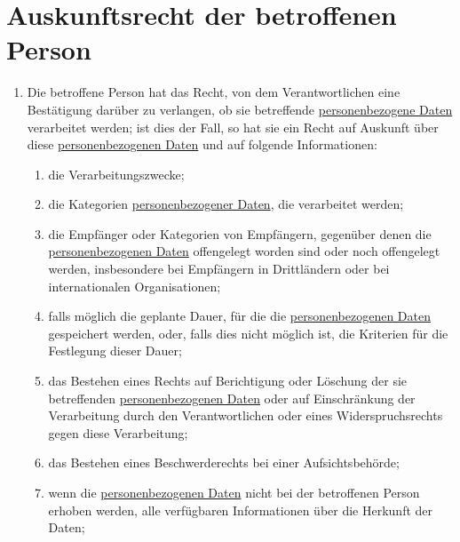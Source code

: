 \chapter{Auskunftsrecht der betroffenen Person}
\label{ch:15}


\begin{enumerate}

  \item Die betroffene Person hat das Recht, von dem Verantwortlichen eine Bestätigung darüber zu verlangen, ob sie
   betreffende \hyperref[itm:04-1]{personenbezogene Daten} verarbeitet werden; ist dies der Fall, so hat sie ein Recht auf Auskunft über
   diese \hyperref[itm:04-1]{personenbezogenen Daten} und auf folgende Informationen:
  \label{itm:15-1}

  \begin{enumerate}
  
    \item die Verarbeitungszwecke;
    \label{itm:15-1a}

    \item die Kategorien \hyperref[itm:04-1]{personenbezogener Daten}, die verarbeitet werden;
    \label{itm:15-1b}

    \item die Empfänger oder Kategorien von Empfängern, gegenüber denen die \hyperref[itm:04-1]{personenbezogenen Daten} offengelegt worden
     sind oder noch offengelegt werden, insbesondere bei Empfängern in Drittländern oder bei internationalen
     Organisationen;
    \label{itm:15-1c}

    \item falls möglich die geplante Dauer, für die die \hyperref[itm:04-1]{personenbezogenen Daten} gespeichert werden, oder, falls dies
     nicht möglich ist, die Kriterien für die Festlegung dieser Dauer;
    \label{itm:15-1d}

    \item das Bestehen eines Rechts auf Berichtigung oder Löschung der sie betreffenden \hyperref[itm:04-1]{personenbezogenen Daten} oder auf
     Einschränkung der Verarbeitung durch den Verantwortlichen oder eines Widerspruchsrechts gegen diese Verarbeitung;
    \label{itm:15-1e}

    \item das Bestehen eines Beschwerderechts bei einer Aufsichtsbehörde;
    \label{itm:15-1f}

    \item wenn die \hyperref[itm:04-1]{personenbezogenen Daten} nicht bei der betroffenen Person erhoben werden, alle verfügbaren
     Informationen über die Herkunft der Daten;
    \label{itm:15-1g}


\end{enumerate}
\end{enumerate}
